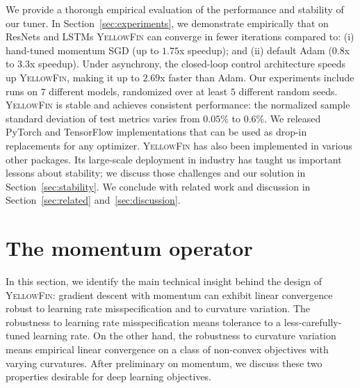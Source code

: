 \documentclass{article} %
\newcommand{\tuner}{\textsc{YellowFin}\xspace}
\newcommand{\yell}[1]{#1}
\begin{document}
We provide a thorough empirical evaluation of the performance and stability of our tuner.
In Section~\ref{sec:experiments}, we demonstrate empirically that \yell{on ResNets and LSTMs}
\tuner can converge in fewer iterations compared to:
(i) hand-tuned momentum SGD (up to $1.75$x speedup);
and (ii) default Adam ($0.8$x to $3.3$x speedup).
Under asynchrony, the closed-loop control architecture speeds up \tuner, 
making it up to $2.69$x faster than Adam. 
Our experiments include runs on $7$ different models, randomized over at least $5$ different random seeds. 
\tuner is stable and achieves consistent performance: the normalized sample standard deviation of test metrics varies from $0.05\%$ to $0.6\%$.
We released PyTorch and TensorFlow implementations that can be used as drop-in replacements for any optimizer.
\tuner has also been implemented in various other packages.
Its large-scale deployment in industry has taught us important lessons about stability; we discuss those challenges and our solution in Section~\ref{sec:stability}.
We conclude with related work and discussion in Section~\ref{sec:related} and~\ref{sec:discussion}.



\section{The momentum operator}
\label{sec:momentum_operator}

\newcommand{\gc}{generalized curvature\xspace}
\newcommand{\Gc}{Generalized curvature\xspace}
In this section, we identify the main technical insight behind the design of \tuner:
 gradient descent with momentum can exhibit linear convergence robust to learning rate misspecification and to curvature variation.
The robustness to learning rate misspecification means tolerance to a less-carefully-tuned learning rate.
On the other hand, the robustness to curvature variation means empirical linear convergence on a class of non-convex objectives with varying curvatures.
After preliminary on momentum, 
we discuss these two properties desirable for deep learning objectives.
\end{document}
